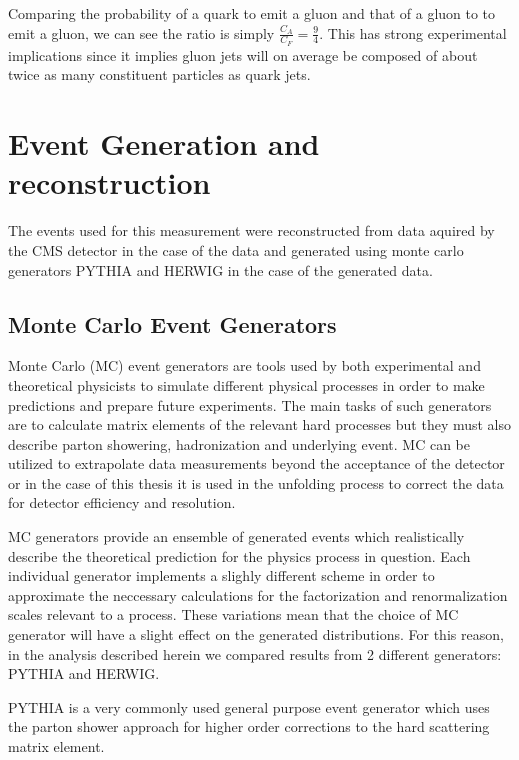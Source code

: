 Comparing the probability of a quark to emit a gluon and that of a gluon to to emit a gluon, we can see the ratio is simply $\frac{C_A}{C_F} =\frac{9}{4} $. This has strong experimental implications since it implies gluon jets will on average be composed of about twice as many constituent particles as quark jets.






\section{Event Generation and reconstruction}\label{secMCGenReco}


The events used for this measurement were reconstructed from data aquired by the CMS detector in the case of the data and generated using monte carlo generators PYTHIA and HERWIG in the case of the generated data.

\subsection{Monte Carlo Event Generators}\label{secMCGen}

Monte Carlo (MC) event generators are tools used by both experimental and theoretical physicists to simulate different physical processes in order to make predictions and prepare future experiments. The main tasks of such generators are to calculate matrix elements of the relevant hard processes but they must also describe parton showering, hadronization and underlying event. MC can be utilized to extrapolate data measurements beyond the acceptance of the detector or in the case of this thesis it is used in the unfolding process to correct the data for detector efficiency and resolution.


MC generators provide an ensemble of generated events which realistically describe the theoretical prediction for the physics process in question. Each individual generator implements a slighly different scheme in order to approximate the neccessary calculations for the factorization and renormalization scales relevant to a process. These variations mean that the choice of MC generator will have a slight effect on the generated distributions. For this reason, in the analysis described herein we compared results from 2 different generators: PYTHIA and HERWIG.

PYTHIA is a very commonly used general purpose event generator which uses the parton shower approach for higher order corrections to the hard scattering matrix element.

